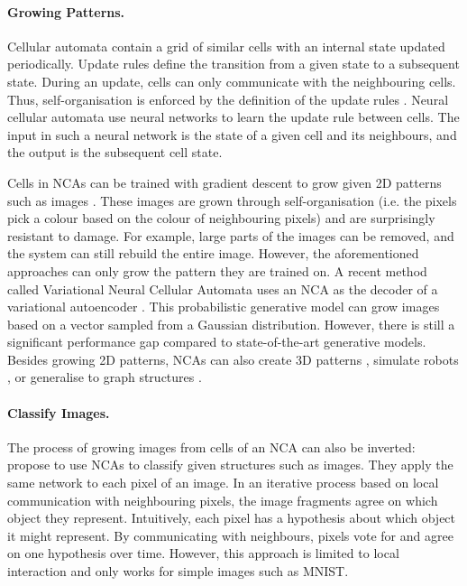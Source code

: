 \paragraph{Growing Patterns.} Cellular automata contain a grid of similar cells with an internal state updated periodically.
Update rules define the transition from a given state to a subsequent state.
During an update, cells can only communicate with the neighbouring cells.
Thus, self-organisation is enforced by the definition of the update rules .
Neural cellular automata  use neural networks to learn the update rule between cells.
The input in such a neural network is the state of a given cell and its neighbours, and the output is the subsequent cell state.

Cells in NCAs can be trained with gradient descent to grow given 2D patterns such as images .
These images are grown through self-organisation (i.e. the pixels pick a colour based on the colour of neighbouring pixels) and are surprisingly resistant to damage.
For example, large parts of the images can be removed, and the system can still rebuild the entire image.
However, the aforementioned approaches can only grow the pattern they are trained on.
A recent method called Variational Neural Cellular Automata  uses an NCA as the decoder of a variational autoencoder .
This probabilistic generative model can grow images based on a vector sampled from a Gaussian distribution.
However, there is still a significant performance gap compared to state-of-the-art generative models.
Besides growing 2D patterns, NCAs can also create 3D patterns , simulate robots , or generalise to graph structures .

\paragraph{Classify Images.} The process of growing images from cells of an NCA can also be inverted:
 propose to use NCAs to classify given structures such as images.
They apply the same network to each pixel of an image.
In an iterative process based on local communication with neighbouring pixels, the image fragments agree on which object they represent.
Intuitively, each pixel has a hypothesis about which object it might represent. By communicating with neighbours, pixels vote for and agree on one hypothesis over time.
However, this approach is limited to local interaction and only works for simple images such as MNIST.

